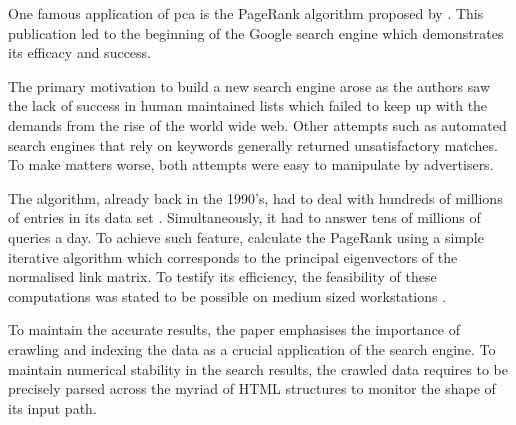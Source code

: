 One famous application of \acrlong{pca} \cite{deisenroth2020mathematics} is the PageRank algorithm proposed by .
This publication led to the beginning of the Google search engine which demonstrates its efficacy and success.

The primary motivation to build a new search engine arose as the authors saw the lack of success in human maintained lists which failed to keep up with the demands from the rise of the world wide web.
Other attempts such as automated search engines that rely on keywords generally returned unsatisfactory matches.
To make matters worse, both attempts were easy to manipulate by advertisers.
\bigskip


The algorithm, already back in the 1990's, had to deal with hundreds of millions of entries in its data set \cite{brin1998anatomy}.
Simultaneously, it had to answer tens of millions of queries a day.
To achieve such feature, \citeauthor{page1999pagerank} calculate the PageRank using a simple iterative algorithm which corresponds to the principal eigenvectors of the normalised link matrix.
To testify its efficiency, the feasibility of these computations was stated to be possible on medium sized workstations \cite{page1999pagerank}.

To maintain the accurate results, the paper emphasises the importance of crawling and indexing the data as a crucial application of the search engine.
To maintain numerical stability in the search results, the crawled data requires to be precisely parsed across the myriad of HTML structures to monitor the shape of its input path.
